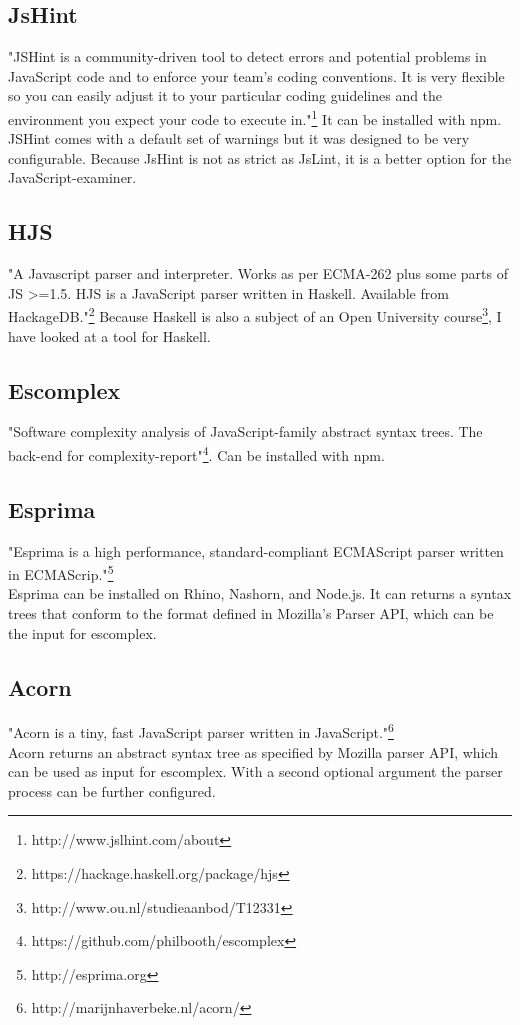 \documentclass{article}
\begin{document}
\subsection{JsHint}
"JSHint is a community-driven tool to detect errors and potential problems in JavaScript code and to enforce your team's coding conventions. It is very flexible so you can easily adjust it to your particular coding guidelines and the environment you expect your code to execute in."\footnote{http://www.jslhint.com/about}
It can be installed with npm.
JSHint comes with a default set of warnings but it was designed to be very configurable.
Because JsHint is not as strict as JsLint, it is a better option for the JavaScript-examiner.

\subsection{HJS}
"A Javascript parser and interpreter. Works as per ECMA-262 plus some parts of JS >=1.5.
HJS is a JavaScript parser written in Haskell. Available from HackageDB."\footnote{https://hackage.haskell.org/package/hjs}
Because Haskell is also a subject of an Open University course\footnote{http://www.ou.nl/studieaanbod/T12331}, I have looked at a tool for Haskell.

\subsection{Escomplex}
"Software complexity analysis of JavaScript-family abstract syntax trees. The back-end for complexity-report"\footnote{https://github.com/philbooth/escomplex}.
Can be installed with npm.

\subsection{Esprima}
"Esprima is a high performance, standard-compliant ECMAScript parser written in ECMAScrip."\footnote{http://esprima.org}\\
Esprima can be installed on Rhino, Nashorn, and Node.js.
It can returns a syntax trees that conform to the format defined in Mozilla's Parser API, which can be the input for escomplex.

\subsection{Acorn}
"Acorn is a tiny, fast JavaScript parser written in JavaScript."\footnote{http://marijnhaverbeke.nl/acorn/}\\
Acorn returns an abstract syntax tree as specified by Mozilla parser API, which can be used as input for escomplex.
With a second optional argument the parser process can be further configured.
\end{document}
